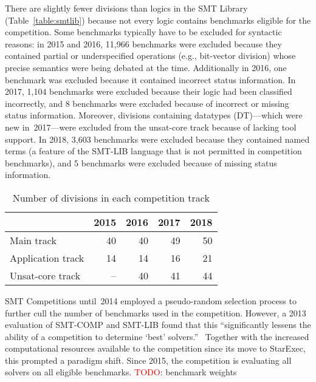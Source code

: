 \documentclass[twoside,11pt]{article}
\newcommand{\TODO}[0]{\textcolor{red}{TODO}}
\begin{document}
There are slightly fewer divisions than logics in the SMT Library
(Table~\ref{table:smtlib}) because not every logic contains benchmarks
eligible for the competition.  Some benchmarks typically have to be
excluded for syntactic reasons: in 2015 and 2016, 11,966 benchmarks
were excluded because they contained partial or underspecified
operations (e.g., bit-vector division) whose precise semantics were
being debated at the time.  Additionally in 2016, one benchmark was
excluded because it contained incorrect status information.  In 2017,
1,104 benchmarks were excluded because their logic had been classified
incorrectly, and 8 benchmarks were excluded because of incorrect or
missing status information.  Moreover, divisions containing datatypes
({DT})---which were new in~2017---were excluded from the unsat-core
track because of lacking tool support.  In 2018, 3,603 benchmarks were
excluded because they contained named terms (a feature of the SMT-LIB
language that is not permitted in competition benchmarks), and 5
benchmarks were excluded because of missing status information.

\begin{table}
  \caption{Number of divisions in each competition track}
  \label{table:divisions}
  \centering
  \begin{tabular}{|l|r|r|r|r|}
    \hline
    & \multicolumn{1}{c|}{2015} & \multicolumn{1}{c|}{2016} & \multicolumn{1}{c|}{2017} & \multicolumn{1}{c|}{2018} \\
    \hline
    Main track        &  40 & 40 & 49 & 50 \\
    Application track &  14 & 14 & 16 & 21 \\
    Unsat-core track  &  -- & 40 & 41 & 44 \\
    \hline
  \end{tabular}
\end{table}

SMT Competitions until~2014 employed a pseudo-random selection process
to further cull the number of benchmarks used in the competition.
However, a 2013 evaluation of SMT-COMP and SMT-LIB found that this
``significantly lessens the ability of a competition to determine
`best' solvers.''~\cite{CSW15} Together with the increased
computational resources available to the competition since its move to
StarExec, this prompted a paradigm shift.  Since 2015, the competition
is evaluating all solvers on all eligible benchmarks. \TODO: benchmark
weights
\end{document}
